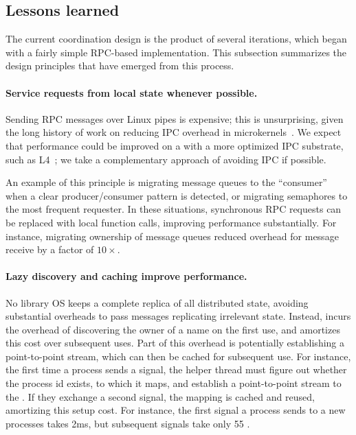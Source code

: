 \subsection{Lessons learned}
\label{sec:libos:namespaces:lessons}

The current coordination design is the product of several iterations, which began 
with a fairly simple RPC-based implementation. %
This subsection summarizes the design principles that have emerged from this process.

\paragraph{Service requests from local state whenever possible.}
Sending RPC messages over Linux pipes is expensive;
this is unsurprising, given the long history of 
work on reducing IPC overhead in microkernels~\cite{liedtke93sosp,chen93memory}.  
We expect that \graphene{} performance could be improved on a 
\microkernel{} with
a more optimized IPC substrate, such as L4~\cite{liedtke95sosp,klein09sel4,elphinstone13microkernels};
we take a complementary approach of avoiding IPC if possible.

An example of this principle is migrating message queues to the ``consumer'' when a 
clear producer/consumer pattern is detected, or migrating semaphores to the most frequent requester.
In these situations, synchronous RPC requests can be replaced with local function calls, improving
performance substantially.  For instance, migrating ownership of message queues 
reduced overhead for message receive by a factor of $10\times$.

\paragraph{Lazy discovery and caching improve performance.}  
No library OS keeps a complete replica of all distributed state,
avoiding substantial overheads to pass messages replicating irrelevant state.
Instead, \graphene{} incurs the overhead of discovering the owner of a name
on the first use, and amortizes this cost over subsequent uses.
Part of this overhead is potentially establishing a point-to-point stream,
which can then be cached for subsequent use.
For instance, the first time a process sends a signal, the helper thread 
must figure out whether the process id exists, to which \picoproc{} it maps,
and establish a point-to-point stream to the \picoproc{}.
If they exchange a second signal, the mapping is cached and reused, amortizing this 
setup cost.  For instance, the first signal a process sends to a new processes
takes \roughly{}2ms, but subsequent signals take only \roughly{}55 \us{}.

